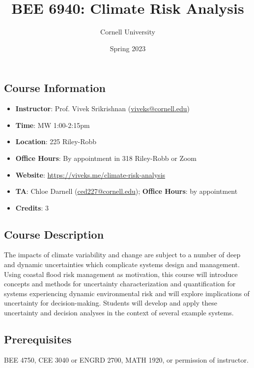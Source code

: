 \documentclass[12pt,a4paper]{article}
\title{ BEE 6940: Climate Risk Analysis }
\author{ Cornell University }
\date{ Spring 2023 }
\begin{document}
\maketitle

\subsection{Course Information}
\begin{itemize}
\item \textbf{Instructor}: Prof. Vivek Srikrishnan (\href{mailto:viveks@cornell.edu}{viveks@cornell.edu})


\item \textbf{Time}: MW 1:00-2:15pm


\item \textbf{Location}: 225 Riley-Robb


\item \textbf{Office Hours}: By appointment in 318 Riley-Robb or Zoom


\item \textbf{Website}: \href{https://viveks.me/climate-risk-analysis}{https://viveks.me/climate-risk-analysis}

\item \textbf{TA}: Chloe Darnell (\href{mailto:ced227@cornell.edu}{ced227@cornell.edu}); \textbf{Office Hours}: by appointment


\item \textbf{Credits}: 3

\end{itemize}
\subsection{Course Description}
The impacts of climate variability and change are subject to a number of deep and dynamic uncertainties which complicate systems design and management. Using coastal flood risk management as motivation, this course will introduce concepts and methods for uncertainty characterization and quantification for systems experiencing dynamic environmental risk and will explore implications of uncertainty for decision-making. Students will develop and apply these uncertainty and decision analyses in the context of several example systems. 

\subsection{Prerequisites}
BEE 4750, CEE 3040 or ENGRD 2700, MATH 1920, or permission of instructor. 
\end{document}
